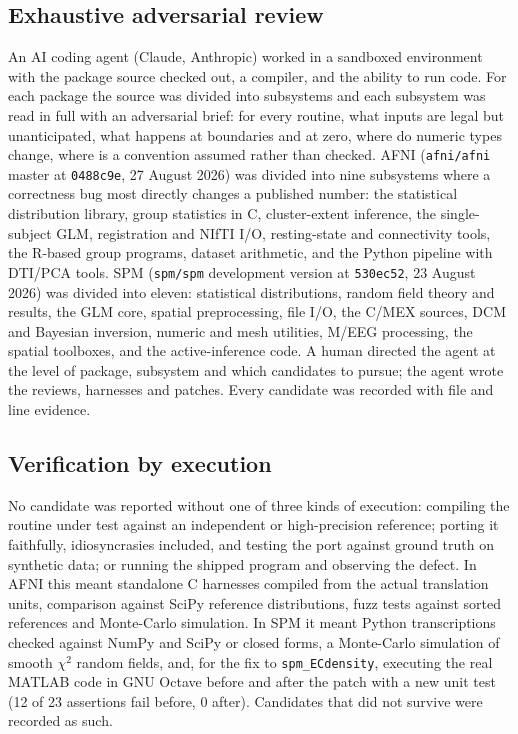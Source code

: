 \documentclass[11pt]{article}
\newcommand{\code}[1]{\texttt{#1}}
\begin{document}
\subsection{Exhaustive adversarial review}
An AI coding agent (Claude, Anthropic) worked in a sandboxed environment with the package source checked out, a compiler, and the ability to run code. For each package the source was divided into subsystems and each subsystem was read in full with an adversarial brief: for every routine, what inputs are legal but unanticipated, what happens at boundaries and at zero, where do numeric types change, where is a convention assumed rather than checked. AFNI (\code{afni/afni} master at \code{0488c9e}, 27 August 2026) was divided into nine subsystems where a correctness bug most directly changes a published number: the statistical distribution library, group statistics in C, cluster-extent inference, the single-subject GLM, registration and NIfTI I/O, resting-state and connectivity tools, the R-based group programs, dataset arithmetic, and the Python pipeline with DTI/PCA tools. SPM (\code{spm/spm} development version at \code{530ec52}, 23 August 2026) was divided into eleven: statistical distributions, random field theory and results, the GLM core, spatial preprocessing, file I/O, the C/MEX sources, DCM and Bayesian inversion, numeric and mesh utilities, M/EEG processing, the spatial toolboxes, and the active-inference code. A human directed the agent at the level of package, subsystem and which candidates to pursue; the agent wrote the reviews, harnesses and patches. Every candidate was recorded with file and line evidence.

\subsection{Verification by execution}
No candidate was reported without one of three kinds of execution: compiling the routine under test against an independent or high-precision reference; porting it faithfully, idiosyncrasies included, and testing the port against ground truth on synthetic data; or running the shipped program and observing the defect. In AFNI this meant standalone C harnesses compiled from the actual translation units, comparison against SciPy reference distributions, fuzz tests against sorted references and Monte-Carlo simulation. In SPM it meant Python transcriptions checked against NumPy and SciPy or closed forms, a Monte-Carlo simulation of smooth $\chi^2$ random fields, and, for the fix to \code{spm\_ECdensity}, executing the real MATLAB code in GNU Octave before and after the patch with a new unit test (12 of 23 assertions fail before, 0 after). Candidates that did not survive were recorded as such.
\end{document}
